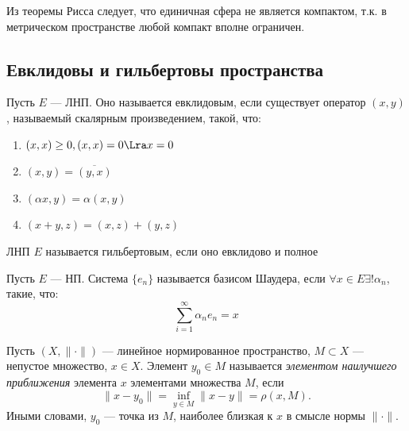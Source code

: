 \begin{corollary}
    Из теоремы Рисса следует, что единичная сфера не является компактом, т.к. в метрическом пространстве любой компакт вполне ограничен.
\end{corollary}


\subsection{Евклидовы и гильбертовы пространства}

\begin{definition}
    Пусть \(E\) --- ЛНП. Оно называется евклидовым, если существует оператор \((x, y)\), называемый скалярным произведением, такой, что:
    \begin{enumerate}
        \item \((x, x) \ge 0, (x, x) = 0 \Lra x = 0\)
        \item \((x, y) = \overline{(y, x)}\)
        \item \((\alpha x, y) = \alpha(x, y)\)
        \item \((x + y, z) = (x, z) + (y, z)\)
    \end{enumerate}
\end{definition}

\begin{definition}
    ЛНП \(E\) называется гильбертовым, если оно евклидово и полное
\end{definition}

\begin{definition}
    Пусть \(E\) --- НП. Система \(\{e_n\}\) называется базисом Шаудера, если \(\forall x \in E \exists! \alpha_n\), такие, что:
    \[\sum_{i = 1}^\infty \alpha_n e_n = x\]
\end{definition}

\begin{definition}
    Пусть \((X, \|\cdot\|)\) --- линейное нормированное пространство, \(M \subset X\) --- непустое множество, \(x \in X\). Элемент \(y_0 \in M\) называется \emph{элементом наилучшего приближения} элемента \(x\) элементами множества \(M\), если
    \[
        \|x - y_0\| = \inf_{y \in M} \|x - y\| = \rho(x, M).
    \]
    Иными словами, \(y_0\) --- точка из \(M\), наиболее близкая к \(x\) в смысле нормы \(\|\cdot\|\).
\end{definition}

